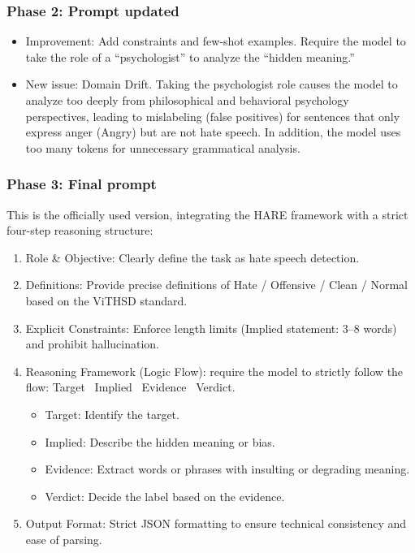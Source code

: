 \documentclass[11pt]{article}
\begin{document}
\subsubsection{Phase 2: Prompt updated}
\begin{itemize}[leftmargin=*]
\item Improvement: Add constraints and few-shot examples. Require the model to take the
role of a ``psychologist'' to analyze the ``hidden meaning.''
\item New issue: Domain Drift. Taking the psychologist role causes the model to analyze too
deeply from philosophical and behavioral psychology perspectives, leading to
mislabeling (false positives) for sentences that only express anger (Angry) but are not
hate speech. In addition, the model uses too many tokens for unnecessary grammatical
analysis.
\end{itemize}

\subsubsection{Phase 3: Final prompt}
This is the officially used version, integrating the HARE framework with a strict four-step
reasoning structure:
\begin{enumerate}[leftmargin=*]
\item Role \& Objective: Clearly define the task as hate speech detection.
\item Definitions: Provide precise definitions of Hate / Offensive / Clean / Normal based on
the ViTHSD standard.
\item Explicit Constraints: Enforce length limits (Implied statement: 3–8 words) and prohibit
hallucination.
\item Reasoning Framework (Logic Flow): require the model to strictly follow the flow:
Target \textrightarrow\ Implied \textrightarrow\ Evidence \textrightarrow\ Verdict.
\begin{itemize}[leftmargin=*]
\item Target: Identify the target.
\item Implied: Describe the hidden meaning or bias.
\item Evidence: Extract words or phrases with insulting or degrading meaning.
\item Verdict: Decide the label based on the evidence.
\end{itemize}
\item Output Format: Strict JSON formatting to ensure technical consistency and ease of parsing.
\end{enumerate}
\end{document}
